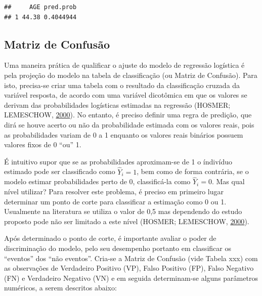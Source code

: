 \documentclass[12pt,brazil,]{book}
\newenvironment{Shaded}{\begin{snugshade}}{\end{snugshade}}
\newcommand{\DataTypeTok}[1]{\textcolor[rgb]{0.13,0.29,0.53}{#1}}
\newcommand{\KeywordTok}[1]{\textcolor[rgb]{0.13,0.29,0.53}{\textbf{#1}}}
\newcommand{\NormalTok}[1]{#1}
\newcommand{\OperatorTok}[1]{\textcolor[rgb]{0.81,0.36,0.00}{\textbf{#1}}}
\newcommand{\StringTok}[1]{\textcolor[rgb]{0.31,0.60,0.02}{#1}}
\begin{document}
\begin{Shaded}
\end{Shaded}

\begin{verbatim}
##     AGE pred.prob
## 1 44.38 0.4044944
\end{verbatim}

\hypertarget{matriz-de-confusao}{%
\subsection{Matriz de Confusão}\label{matriz-de-confusao}}

Uma maneira prática de qualificar o ajuste do modelo de regressão
logística é pela projeção do modelo na tabela de classificação (ou
Matriz de Confusão). Para isto, precisa-se criar uma tabela com o
resultado da classificação cruzada da variável resposta, de acordo com
uma variável dicotômica em que os valores se derivam das probabilidades
logísticas estimadas na regressão (HOSMER; LEMESCHOW,
\protect\hyperlink{ref-Hosmer2000}{2000}). No entanto, é preciso definir
uma regra de predição, que dirá se houve acerto ou não da probabilidade
estimada com os valores reais, pois as probabilidades variam de 0 a 1
enquanto os valores reais binários possuem valores fixos de 0 ``ou'' 1.

É intuitivo supor que se as probabilidades aproximam-se de 1 o índivíduo
estimado pode ser classificado como \(\hat Y_i=1\), bem como de forma
contrária, se o modelo estimar probabilidades perto de 0, classificá-la
como \(\hat Y_i=0\). Mas qual nível utilizar? Para resolver este
problema, é preciso em primeiro lugar determinar um ponto de corte para
classificar a estimação como 0 ou 1. Usualmente na literatura se utiliza
o valor de 0,5 mas dependendo do estudo proposto pode não ser limitado a
este nível (HOSMER; LEMESCHOW,
\protect\hyperlink{ref-Hosmer2000}{2000}).

Após determinado o ponto de corte, é importante avaliar o poder de
discriminação do modelo, pelo seu desempenho portanto em classificar os
``eventos'' dos ``não eventos''. Cria-se a Matriz de Confusão (vide
Tabela xxx) com as observações de Verdadeiro Positivo (VP), Falso
Positivo (FP), Falso Negativo (FN) e Verdadeiro Negativo (VN) e em
seguida determinam-se alguns parâmetros numéricos, a serem descritos
abaixo:
\end{document}
